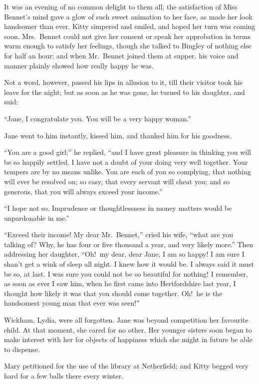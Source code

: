 \documentclass[12pt,english,oneside]{book}
\begin{document}
It was an evening of no common delight to them all; the satisfaction
of Miss Bennet's mind gave a glow of such sweet animation to her face,
as made her look handsomer than ever. Kitty simpered and smiled, and
hoped her turn was coming soon. Mrs.\ Bennet could not give her consent
or speak her approbation in terms warm enough to satisfy her feelings,
though she talked to Bingley of nothing else for half an hour; and
when Mr.\ Bennet joined them at supper, his voice and manner plainly
showed how really happy he was.

Not a word, however, passed his lips in allusion to it, till their
visitor took his leave for the night; but as soon as he was gone,
he turned to his daughter, and said:

{}``Jane, I congratulate you. You will be a very happy woman.''

Jane went to him instantly, kissed him, and thanked him for his goodness.

{}``You are a good girl;'' he replied, {}``and I have great pleasure
in thinking you will be so happily settled. I have not a doubt of
your doing very well together. Your tempers are by no means unlike.
You are each of you so complying, that nothing will ever be resolved
on; so easy, that every servant will cheat you; and so generous, that
you will always exceed your income.''

{}``I hope not so. Imprudence or thoughtlessness in money matters
would be unpardonable in me.''

{}``Exceed their income! My dear Mr.\ Bennet,'' cried his wife,
{}``what are you talking of? Why, he has four or five thousand a
year, and very likely more.'' Then addressing her daughter, {}``Oh!\ my
dear, dear Jane, I am so happy! I am sure I shan't get a wink of sleep
all night. I knew how it would be. I always said it must be so, at
last. I was sure you could not be so beautiful for nothing! I remember,
as soon as ever I saw him, when he first came into Hertfordshire last
year, I thought how likely it was that you should come together. Oh!\ he
is the handsomest young man that ever was seen!''

Wickham, Lydia, were all forgotten. Jane was beyond competition her
favourite child. At that moment, she cared for no other. Her younger
sisters soon began to make interest with her for objects of happiness
which she might in future be able to dispense.

Mary petitioned for the use of the library at Netherfield; and Kitty
begged very hard for a few balls there every winter.
\end{document}
